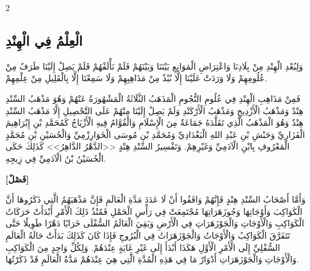 \documentclass[11pt,a4paper]{article}
\newcommand{\ar}[1]{\arabicfont\beginR #1\endR}
\begin{document}
\begin{paracol}{2}
\sloppy

\begin{leftcolumn}
\subsection*{\ar{الْعِلْمُ فِي الْهِنْدِ}}
\vspace{0.3cm}
{\arabicfont\beginR
وَلِبُعْدِ الْهِنْدِ مِنْ بِلَادِنَا وَاعْتِرَاضِ الْمَوَانِعِ بَيْنَنَا وَبَيْنَهُمْ فَلَمْ نَأْلَفْهُمْ فَلَمْ يَصِلْ إِلَيْنَا طَرَفٌ مِنْ عُلُومِهِمْ وَلَا وَرَدَتْ عَلَيْنَا إِلَّا نُبْذٌ مِنْ مَذَاهِبِهِمْ وَلَا سَمِعْنَا إِلَّا بِالْقَلِيلِ مِنْ عِلْمِهِمْ.
\endR}

\vspace{0.3cm}
{\arabicfont\beginR
فَمِنْ مَذَاهِبِ الْهِنْدِ فِي عُلُومِ النُّجُومِ الْمَذَهَبُ الثَّلَاثَةُ الْمَشْهُورَةُ عَنْهُمْ وَهُوَ مَذْهَبُ السِّنْدِ هِنْدٌ وَمَذْهَبُ الْأَزْدِيجِ وَمَذْهَبُ الْأَرْكَنْدِ وَلَمْ يَصِلْ إِلَيْنَا مِنْهُمْ عَلَى التَّحْصِيلِ إِلَّا مَذْهَبُ السِّنْدِ هِنْدٌ وَهُوَ الْمَذْهَبُ الَّذِي تَقَلَّدَهُ جَمَاعَةٌ مِنَ الْإِسْلَامِ وَالْقُوَّامُ فِيهِ الْأَزْيَاجُ كَمُحَمَّدِ بْنِ إِبْرَاهِيمَ الْفَزَارِيِّ وَحَبْشِ بْنِ عَبْدِ اللهِ الْبَغْدَادِيِّ وَمُحَمَّدِ بْنِ مُوسَى الْخَوَارِزْمِيِّ وَالْحُسَيْنِ بْنِ مُحَمَّدٍ الْمَعْرُوفِ بِابْنِ الْآدَمِيِّ وَغَيْرِهِمْ. وَتَفْسِيرُ السِّنْدِ هِنْدٍ <<الدَّهْرُ الدَّاهِرُ>> كَذَلِكَ حَكَى الْحُسَيْنُ بْنُ الْآدَمِيِّ فِي زِيجِهِ.
\endR}

\vspace{0.4cm}
{\arabicfont\beginR
\textbf{[فَصْلٌ]}
\endR}

\vspace{0.3cm}
{\arabicfont\beginR
وَأَمَّا أَصْحَابُ السِّنْدِ هِنْدٍ فَإِنَّهُمْ وَافَقُوا أَنْ لَا عَدَدَ مَدَّةِ الْعَالَمِ فَإِنَّ مَذْهَبَهُمُ الَّتِي ذَكَرُوهَا أَنَّ الْكَوَاكِبَ وَأَوْجَاتِهَا وَجُوزَهَرَاتِهَا مُجْتَمِعَتْ فِي رَأْسِ الْحَمْلِ فَمُنْذُ ذَلِكَ الْأَمْرِ أَبْدَأَتْ حَرَكَاتُ الْكَوَاكِبِ وَالْأَوْجَاتِ وَالْجَوْزَهَرَاتِ فِي الْأَرْضِ وَبَقِيَ الْعَالَمُ السُّفْلَى خَرَابًا دَهْرًا طَوِيلًا حَتَّى تَتَفَرَّقَ الْكَوَاكِبُ وَالْأَوْجَاتُ وَالْجَوْزَهَرَاتُ فِي الْبُرُوجِ فَإِذَا كَانَ كَذَلِكَ بَدَأَتْ حَالَةُ الْعَالَمِ السُّفْلِيِّ إِلَى الْأَمْرِ الْأَوَّلِ هَكَذَا أَبْدَأَ إِلَى غَيْرِ غَايَةٍ عِنْدَهُمْ. وَلِكُلِّ وَاحِدٍ مِنَ الْكَوَاكِبِ وَالْأَوْجَاتِ وَالْجَوْزَهَرَاتِ أَدْوَارٌ مَا فِي هَذِهِ الْمُدَّةِ الَّتِي هِيَ عِنْدَهُمْ مَدَّةُ الْعَالَمِ قَدْ ذَكَرْتُهَا.
\endR}
\end{leftcolumn}


\end{paracol}
\end{document}

